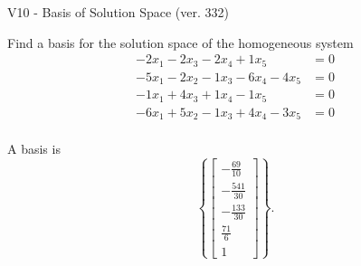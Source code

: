 \begin{exercise}
  \begin{exerciseTitle}V10 - Basis of Solution Space (ver. 332)\end{exerciseTitle}
  \begin{exerciseStatement}
    Find a basis for the solution space of the homogeneous system 
\begin{align*}
 -2 x_ 1 -2 x_ 3 -2 x_ 4 + 1 x_ 5 &= 0  \\ 
  -5 x_ 1 -2 x_ 2 -1 x_ 3 -6 x_ 4 -4 x_ 5 &= 0  \\ 
  -1 x_ 1 + 4 x_ 3 + 1 x_ 4 -1 x_ 5 &= 0  \\ 
  -6 x_ 1 + 5 x_ 2 -1 x_ 3 + 4 x_ 4 -3 x_ 5 &= 0  \\ 
 \end{align*}


 
  \end{exerciseStatement}

  \begin{exerciseAnswer}
   A basis is   
\[\left\{\left[\begin{array}{c}
-\frac{69}{10} \\
-\frac{541}{30} \\
-\frac{133}{30} \\
\frac{71}{6} \\
1
\end{array}\right]\right\}.\]

  


  \end{exerciseAnswer}
\end{exercise}